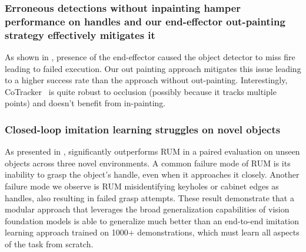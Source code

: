 \subsubsection{Erroneous detections without inpainting hamper performance on 
handles and our end-effector out-painting strategy effectively mitigates it} 
As shown in , presence of the end-effector caused the object
detector to miss fire leading to failed execution. Our out painting approach
mitigates this issue leading to a higher success rate than the 
approach without out-painting. Interestingly, CoTracker~\cite{karaev2023cotracker} is quite robust
to occlusion (possibly because it tracks multiple points) and doesn't benefit
from in-painting. 


\subsubsection{Closed-loop imitation learning struggles on novel objects}
As presented in , \name significantly outperforms RUM in a paired evaluation on unseen objects across three novel environments. A common failure mode of RUM is its inability to grasp the object's handle, even when it approaches it closely.
Another failure mode we observe is RUM misidentifying keyholes or cabinet edges as handles, also resulting in failed grasp attempts.
These result demonstrate that a modular approach that leverages the broad generalization capabilities of vision foundation models is able to generalize much better than an end-to-end imitation learning approach trained on 1000+ demonstrations, which must learn all aspects of the task from scratch.


